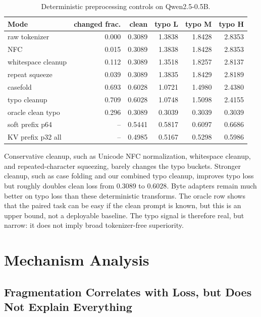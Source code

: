 \documentclass[runningheads]{llncs}
\newcommand{\qwen}{Qwen2.5-0.5B}
\begin{document}
\begin{table}[t]
\centering
\caption{Deterministic preprocessing controls on \qwen{}.}
\label{tab:preprocess}
\small
\setlength{\tabcolsep}{4pt}
\begin{tabular}{lrrrrr}
\toprule
Mode & changed frac. & clean & typo L & typo M & typo H \\
\midrule
raw tokenizer & 0.000 & 0.3089 & 1.3838 & 1.8428 & 2.8353 \\
NFC & 0.015 & 0.3089 & 1.3838 & 1.8428 & 2.8353 \\
whitespace cleanup & 0.112 & 0.3089 & 1.3518 & 1.8257 & 2.8137 \\
repeat squeeze & 0.039 & 0.3089 & 1.3835 & 1.8429 & 2.8189 \\
casefold & 0.693 & 0.6028 & 1.0721 & 1.4980 & 2.4380 \\
typo cleanup & 0.709 & 0.6028 & 1.0748 & 1.5098 & 2.4155 \\
oracle clean typo & 0.296 & 0.3089 & 0.3039 & 0.3039 & 0.3039 \\
\midrule
soft prefix p64 & -- & 0.5441 & 0.5817 & 0.6097 & 0.6686 \\
KV prefix p32 all & -- & 0.4985 & 0.5167 & 0.5298 & 0.5986 \\
\bottomrule
\end{tabular}
\end{table}

Conservative cleanup, such as Unicode NFC normalization, whitespace cleanup, and repeated-character squeezing, barely changes the typo buckets. Stronger cleanup, such as case folding and our combined typo cleanup, improves typo loss but roughly doubles clean loss from $0.3089$ to $0.6028$. Byte adapters remain much better on typo loss than these deterministic transforms. The oracle row shows that the paired task can be easy if the clean prompt is known, but this is an upper bound, not a deployable baseline. The typo signal is therefore real, but narrow: it does not imply broad tokenizer-free superiority.

\section{Mechanism Analysis}

\subsection{Fragmentation Correlates with Loss, but Does Not Explain Everything}
\end{document}
